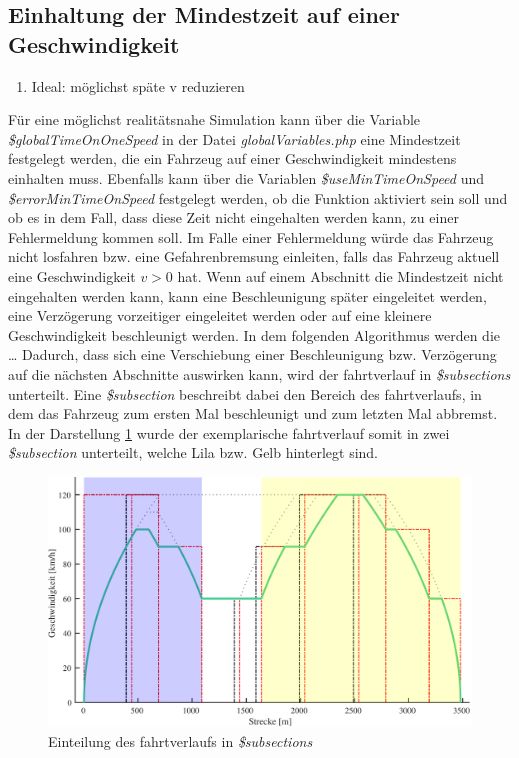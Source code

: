 \subsection{Einhaltung der Mindestzeit auf einer Geschwindigkeit} \label{minTime}
\begin{enumerate}
\item Ideal: möglichst späte v reduzieren
\end{enumerate}
Für eine möglichst realitätsnahe Simulation kann über die Variable \textit{\$globalTimeOnOneSpeed} in der Datei \textit{globalVariables.php} eine Mindestzeit festgelegt werden, die ein Fahrzeug auf einer Geschwindigkeit mindestens einhalten muss. Ebenfalls kann über die Variablen \textit{\$useMinTimeOnSpeed} und \textit{\$errorMinTimeOnSpeed} festgelegt werden, ob die Funktion aktiviert sein soll und ob es in dem Fall, dass diese Zeit nicht eingehalten werden kann, zu einer Fehlermeldung kommen soll. Im Falle einer Fehlermeldung würde das Fahrzeug nicht losfahren bzw. eine Gefahrenbremsung einleiten, falls das Fahrzeug aktuell eine Geschwindigkeit $v > 0$ hat. 
Wenn auf einem Abschnitt die Mindestzeit nicht eingehalten werden kann, kann eine Beschleunigung später eingeleitet werden, eine Verzögerung vorzeitiger eingeleitet werden oder auf eine kleinere Geschwindigkeit beschleunigt werden. In dem folgenden Algorithmus werden die \dots
Dadurch, dass sich eine Verschiebung einer Beschleunigung bzw. Verzögerung auf die nächsten Abschnitte auswirken kann, wird der \Gls{fahrtverlauf} in \textit{\$subsections} unterteilt. Eine \textit{\$subsection} beschreibt dabei den Bereich des \Gls{fahrtverlauf}s, in dem das Fahrzeug zum ersten Mal beschleunigt und zum letzten Mal abbremst. In der Darstellung \ref{fig:it7} wurde der exemplarische \Gls{fahrtverlauf} somit in zwei \textit{\$subsection} unterteilt, welche Lila bzw. Gelb hinterlegt sind.
\begin{figure}
\includegraphics[width=\linewidth]{../images/matlab/it7.pdf}
\caption{Einteilung des \Gls{fahrtverlauf}s in \textit{\$subsections}}
\label{fig:it7}
\end{figure}
